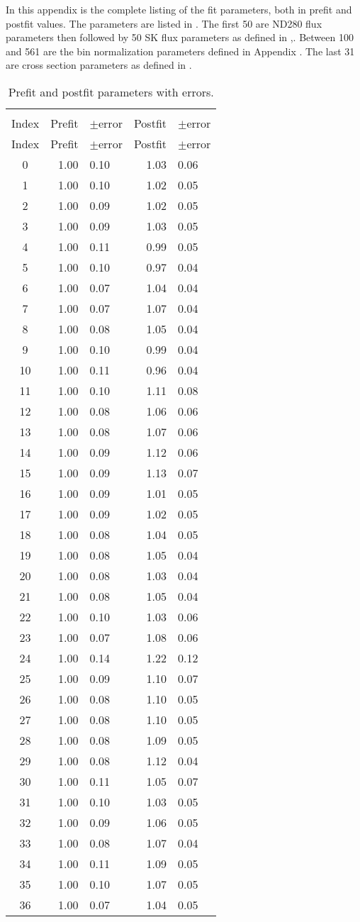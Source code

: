 In this appendix is the complete listing of the fit parameters, both
in prefit and postfit values. The parameters are listed in .
The first 50 are ND280 flux parameters then followed by 50 SK flux
parameters as defined in ,. Between 100
and 561 are the bin normalization parameters defined in Appendix .
The last 31 are cross section parameters as defined in .\newpage{}

\begin{longtable}[c]{crlrl}
\hline
\caption[Prefit and Postfit Parameters with Errors]{Prefit and postfit parameters with errors.\label{tab:Prefit-and-postfit}}
\tabularnewline
Index & Prefit & $\pm$error & Postfit & $\pm$error\tabularnewline
\hline
\endfirsthead
\hline
Index & Prefit & $\pm$error & Postfit & $\pm$error\tabularnewline
\hline
\endhead
0 & 1.00 & 0.10 & 1.03 & 0.06\tabularnewline
1 & 1.00 & 0.10 & 1.02 & 0.05\tabularnewline
2 & 1.00 & 0.09 & 1.02 & 0.05\tabularnewline
3 & 1.00 & 0.09 & 1.03 & 0.05\tabularnewline
4 & 1.00 & 0.11 & 0.99 & 0.05\tabularnewline
5 & 1.00 & 0.10 & 0.97 & 0.04\tabularnewline
6 & 1.00 & 0.07 & 1.04 & 0.04\tabularnewline
7 & 1.00 & 0.07 & 1.07 & 0.04\tabularnewline
8 & 1.00 & 0.08 & 1.05 & 0.04\tabularnewline
9 & 1.00 & 0.10 & 0.99 & 0.04\tabularnewline
10 & 1.00 & 0.11 & 0.96 & 0.04\tabularnewline
11 & 1.00 & 0.10 & 1.11 & 0.08\tabularnewline
12 & 1.00 & 0.08 & 1.06 & 0.06\tabularnewline
13 & 1.00 & 0.08 & 1.07 & 0.06\tabularnewline
14 & 1.00 & 0.09 & 1.12 & 0.06\tabularnewline
15 & 1.00 & 0.09 & 1.13 & 0.07\tabularnewline
16 & 1.00 & 0.09 & 1.01 & 0.05\tabularnewline
17 & 1.00 & 0.09 & 1.02 & 0.05\tabularnewline
18 & 1.00 & 0.08 & 1.04 & 0.05\tabularnewline
19 & 1.00 & 0.08 & 1.05 & 0.04\tabularnewline
20 & 1.00 & 0.08 & 1.03 & 0.04\tabularnewline
21 & 1.00 & 0.08 & 1.05 & 0.04\tabularnewline
22 & 1.00 & 0.10 & 1.03 & 0.06\tabularnewline
23 & 1.00 & 0.07 & 1.08 & 0.06\tabularnewline
24 & 1.00 & 0.14 & 1.22 & 0.12\tabularnewline
25 & 1.00 & 0.09 & 1.10 & 0.07\tabularnewline
26 & 1.00 & 0.08 & 1.10 & 0.05\tabularnewline
27 & 1.00 & 0.08 & 1.10 & 0.05\tabularnewline
28 & 1.00 & 0.08 & 1.09 & 0.05\tabularnewline
29 & 1.00 & 0.08 & 1.12 & 0.04\tabularnewline
30 & 1.00 & 0.11 & 1.05 & 0.07\tabularnewline
31 & 1.00 & 0.10 & 1.03 & 0.05\tabularnewline
32 & 1.00 & 0.09 & 1.06 & 0.05\tabularnewline
33 & 1.00 & 0.08 & 1.07 & 0.04\tabularnewline
34 & 1.00 & 0.11 & 1.09 & 0.05\tabularnewline
35 & 1.00 & 0.10 & 1.07 & 0.05\tabularnewline
36 & 1.00 & 0.07 & 1.04 & 0.05\tabularnewline

\end{longtable}
